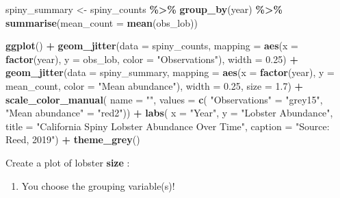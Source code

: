 \documentclass[
]{article}
\newenvironment{Shaded}{\begin{snugshade}}{\end{snugshade}}
\newcommand{\AttributeTok}[1]{\textcolor[rgb]{0.13,0.29,0.53}{#1}}
\newcommand{\FloatTok}[1]{\textcolor[rgb]{0.00,0.00,0.81}{#1}}
\newcommand{\FunctionTok}[1]{\textcolor[rgb]{0.13,0.29,0.53}{\textbf{#1}}}
\newcommand{\NormalTok}[1]{#1}
\newcommand{\OtherTok}[1]{\textcolor[rgb]{0.56,0.35,0.01}{#1}}
\newcommand{\SpecialCharTok}[1]{\textcolor[rgb]{0.81,0.36,0.00}{\textbf{#1}}}
\newcommand{\StringTok}[1]{\textcolor[rgb]{0.31,0.60,0.02}{#1}}
\providecommand{\tightlist}{%
  \setlength{\itemsep}{0pt}\setlength{\parskip}{0pt}}
\begin{document}
\begin{Shaded}
\begin{Highlighting}[]
\NormalTok{spiny\_summary }\OtherTok{\textless{}{-}}\NormalTok{ spiny\_counts }\SpecialCharTok{\%\textgreater{}\%} 
    \FunctionTok{group\_by}\NormalTok{(year) }\SpecialCharTok{\%\textgreater{}\%} 
    \FunctionTok{summarise}\NormalTok{(}\AttributeTok{mean\_count =} \FunctionTok{mean}\NormalTok{(obs\_lob))}


\FunctionTok{ggplot}\NormalTok{() }\SpecialCharTok{+} 
  \FunctionTok{geom\_jitter}\NormalTok{(}\AttributeTok{data =}\NormalTok{ spiny\_counts,}
    \AttributeTok{mapping =} \FunctionTok{aes}\NormalTok{(}\AttributeTok{x =} \FunctionTok{factor}\NormalTok{(year), }\AttributeTok{y =}\NormalTok{ obs\_lob,}
        \AttributeTok{color =} \StringTok{"Observations"}\NormalTok{),}
    \AttributeTok{width =} \FloatTok{0.25}\NormalTok{) }\SpecialCharTok{+} 
  \FunctionTok{geom\_jitter}\NormalTok{(}\AttributeTok{data =}\NormalTok{ spiny\_summary,}
    \AttributeTok{mapping =} \FunctionTok{aes}\NormalTok{(}\AttributeTok{x =} \FunctionTok{factor}\NormalTok{(year), }\AttributeTok{y =}\NormalTok{ mean\_count,}
        \AttributeTok{color =} \StringTok{"Mean abundance"}\NormalTok{),}
    \AttributeTok{width =} \FloatTok{0.25}\NormalTok{,}
    \AttributeTok{size =} \FloatTok{1.7}\NormalTok{) }\SpecialCharTok{+} 
  \FunctionTok{scale\_color\_manual}\NormalTok{(}
    \AttributeTok{name =} \StringTok{""}\NormalTok{,}
    \AttributeTok{values =} \FunctionTok{c}\NormalTok{(}
      \StringTok{"Observations"} \OtherTok{=} \StringTok{"grey15"}\NormalTok{,}
      \StringTok{"Mean abundance"} \OtherTok{=} \StringTok{"red2"}\NormalTok{)) }\SpecialCharTok{+}
  \FunctionTok{labs}\NormalTok{(}
    \AttributeTok{x =} \StringTok{"Year"}\NormalTok{,}
    \AttributeTok{y =} \StringTok{"Lobster Abundance"}\NormalTok{,}
    \AttributeTok{title =} \StringTok{"California Spiny Lobster Abundance Over Time"}\NormalTok{,}
    \AttributeTok{caption =} \StringTok{"Source: Reed, 2019"}\NormalTok{) }\SpecialCharTok{+}
  \FunctionTok{theme\_grey}\NormalTok{()}
\end{Highlighting}
\end{Shaded}

Create a plot of lobster \textbf{size} :

\begin{enumerate}
\def\labelenumi{\arabic{enumi})}
\setcounter{enumi}{3}
\tightlist
\item
  You choose the grouping variable(s)!
\end{enumerate}
\end{document}
